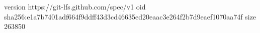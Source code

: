 version https://git-lfs.github.com/spec/v1
oid sha256:e1a7b7401adf664f9ddff43d3cd46635ed20eaac3e264f2b7d9eaef1070aa74f
size 263850
